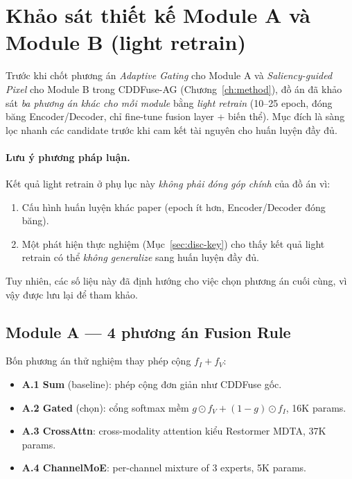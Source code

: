 \section{Khảo sát thiết kế Module A và Module B (light retrain)}
\label{app:design-exploration}

Trước khi chốt phương án \emph{Adaptive Gating} cho Module A và \emph{Saliency-guided Pixel} cho Module B trong CDDFuse-AG (Chương~\ref{ch:method}), đồ án đã khảo sát \emph{ba phương án khác cho mỗi module} bằng \emph{light retrain} (10--25 epoch, đóng băng Encoder/Decoder, chỉ fine-tune fusion layer + biến thể). Mục đích là sàng lọc nhanh các candidate trước khi cam kết tài nguyên cho huấn luyện đầy đủ.

\paragraph{Lưu ý phương pháp luận.}
Kết quả light retrain ở phụ lục này \emph{không phải đóng góp chính} của đồ án vì:
\begin{enumerate}\itemsep0pt
    \item Cấu hình huấn luyện khác paper (epoch ít hơn, Encoder/Decoder đóng băng).
    \item Một phát hiện thực nghiệm (Mục~\ref{sec:disc-key}) cho thấy kết quả light retrain có thể \emph{không generalize} sang huấn luyện đầy đủ.
\end{enumerate}
Tuy nhiên, các số liệu này đã định hướng cho việc chọn phương án cuối cùng, vì vậy được lưu lại để tham khảo.

\subsection{Module A --- 4 phương án Fusion Rule}
\label{app:moduleA-ablation}

Bốn phương án thử nghiệm thay phép cộng $f_I + f_V$:
\begin{itemize}\itemsep0pt
    \item \textbf{A.1 Sum} (baseline): phép cộng đơn giản như CDDFuse gốc.
    \item \textbf{A.2 Gated} (chọn): cổng softmax mềm $g \odot f_V + (1-g) \odot f_I$, 16K params.
    \item \textbf{A.3 CrossAttn}: cross-modality attention kiểu Restormer MDTA, 37K params.
    \item \textbf{A.4 ChannelMoE}: per-channel mixture of 3 experts, 5K params.
\end{itemize}

